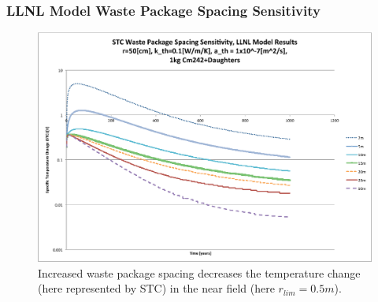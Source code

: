 

\begin{frame}[ctb!]
\frametitle{LLNL Model Waste Package Spacing Sensitivity}

\begin{figure}[htbp!]
\begin{center}
\includegraphics[height=0.7\textheight]{./thermal_demonstration/spacing/Cm242spacing_sens.eps}
\end{center}
\caption[$K_{th}$ Sensitivity to $s$]{Increased waste package 
spacing decreases the temperature change 
(here represented by STC) in the near field (here $r_{lim} = 0.5m$).}
\label{fig:Cm242spacing_sens}
\end{figure}
\end{frame}



